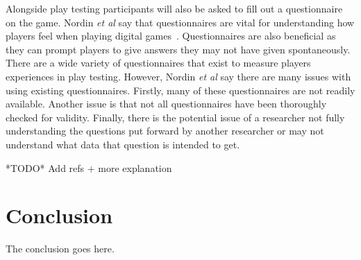 \documentclass[journal]{IEEEtran}
\begin{document}
Alongside play testing participants will also be asked to fill out a questionnaire on the game. Nordin \textit{et al} say that questionnaires are vital for understanding how players feel when playing digital games~\cite{nordin2014}. Questionnaires are also beneficial as they can prompt players to give answers they may not have given spontaneously. There are a wide variety of questionnaires that exist to measure players experiences in play testing. However, Nordin \textit{et al} say there are many issues with using existing questionnaires. Firstly, many of these questionnaires are not readily available. Another issue is that not all questionnaires have been thoroughly checked for validity. Finally, there is the potential issue of a researcher not fully understanding the questions put forward by another researcher or may not understand what data that question is intended to get.
  
  
 
  
*TODO* Add refs + more explanation


\section{Conclusion}
The conclusion goes here.







\end{document}
